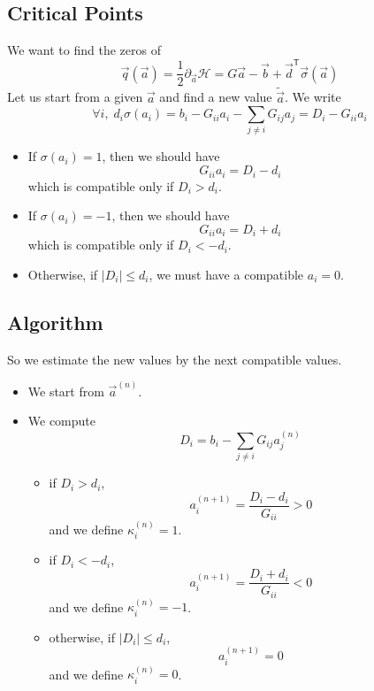 \documentclass{revtex4}
\newcommand{\abs}[1]{\left|#1\right|}
\newcommand{\trn}[1]{{#1}^{\mathsf{T}}}
\begin{document}
\subsection{Critical Points}

We want to find the zeros of
\begin{equation}
	\vec{q}\left(\vec{a}\right) = \dfrac{1}{2} \partial_{\vec{a}} \mathcal{H} = G\vec{a} - \vec{b} + \trn{\vec{d}}\vec{\sigma}\left(\vec{a}\right)
\end{equation}
Let us start from a given $\vec{a}$ and find a new value $\tilde{\vec{a}}$.
We write
\begin{equation}
	\forall i, \; d_i \sigma\left(a_i\right) =  b_i  - G_{ii}a_i - \sum_{j\not=i} G_{ij} a_j = D_i - G_{ii}a_i
\end{equation}

\begin{itemize}
	\item If $\sigma\left(a_i\right)=1$, then we should have
		\begin{equation}
			G_{ii} a_i = D_i - d_i
		\end{equation}
		which is compatible only if $D_i>d_i$.
	\item If $\sigma\left(a_i\right)=-1$, then we should have
	\begin{equation}
		G_{ii} a_i = D_i + d_i
	\end{equation}
	which is compatible only if $D_i<-d_i$.
	\item Otherwise, if $\abs{D_i}\leq d_i$, we must have a compatible $a_i=0$.
\end{itemize}

\subsection{Algorithm}
So we estimate the new values by the next compatible values.

\begin{itemize}
	\item We start from ${\vec{a}}^{(n)}$.
	\item We compute
		\begin{equation}
			D_i = b_i - \sum_{j\not=i} G_{ij}a_j^{(n)}
		\end{equation}
	\begin{itemize}
		\item if $D_i>d_i$, 
			\begin{equation}
				a_i^{(n+1)} = \dfrac{D_i-d_i}{G_{ii}} > 0
			\end{equation}
			and we define $\kappa_i^{(n)}=1$.
		\item if $D_i<-d_i$,
			\begin{equation}
				a_i^{(n+1)} = \dfrac{D_i+d_i}{G_{ii}} < 0
			\end{equation}
			and we define $\kappa_i^{(n)}=-1$.
		\item otherwise, if $\abs{D_i}\leq d_i$, 
			\begin{equation}
				a_i^{(n+1)} = 0
			\end{equation}
		and we define $\kappa_i^{(n)}=0$.
	\end{itemize}
\end{itemize}
\end{document}
